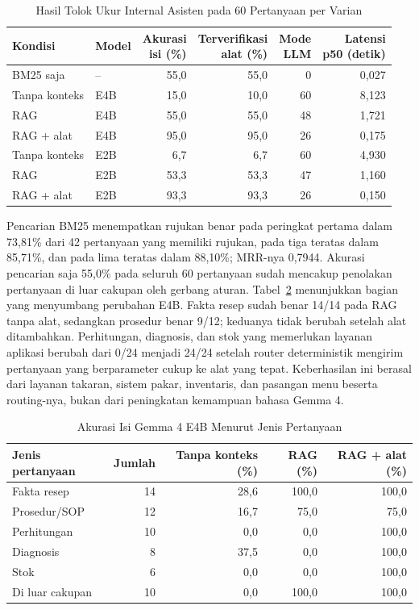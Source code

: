 \begin{table}[htbp]
\centering
\caption{Hasil Tolok Ukur Internal Asisten pada 60 Pertanyaan per Varian}
\label{tab:hasil-asisten}
\small
\begin{tabular}{llrrrr}
\toprule
Kondisi & Model & \shortstack{Akurasi\\isi (\%)} & \shortstack{Terverifikasi\\alat (\%)} & \shortstack{Mode\\LLM} & \shortstack{Latensi\\p50 (detik)} \\
\midrule
BM25 saja & -- & 55,0 & 55,0 & 0 & 0,027 \\
Tanpa konteks & E4B & 15,0 & 10,0 & 60 & 8,123 \\
RAG & E4B & 55,0 & 55,0 & 48 & 1,721 \\
RAG + alat & E4B & 95,0 & 95,0 & 26 & 0,175 \\
Tanpa konteks & E2B & 6,7 & 6,7 & 60 & 4,930 \\
RAG & E2B & 53,3 & 53,3 & 47 & 1,160 \\
RAG + alat & E2B & 93,3 & 93,3 & 26 & 0,150 \\
\bottomrule
\end{tabular}
\end{table}

Pencarian BM25 menempatkan rujukan benar pada peringkat pertama dalam 73,81\% dari 42 pertanyaan yang memiliki rujukan, pada tiga teratas dalam 85,71\%, dan pada lima teratas dalam 88,10\%; MRR-nya 0,7944. Akurasi pencarian saja 55,0\% pada seluruh 60 pertanyaan sudah mencakup penolakan pertanyaan di luar cakupan oleh gerbang aturan. Tabel~\ref{tab:hasil-asisten-kategori} menunjukkan bagian yang menyumbang perubahan E4B. Fakta resep sudah benar 14/14 pada RAG tanpa alat, sedangkan prosedur benar 9/12; keduanya tidak berubah setelah alat ditambahkan. Perhitungan, diagnosis, dan stok yang memerlukan layanan aplikasi berubah dari 0/24 menjadi 24/24 setelah router deterministik mengirim pertanyaan yang berparameter cukup ke alat yang tepat. Keberhasilan ini berasal dari layanan takaran, sistem pakar, inventaris, dan pasangan menu beserta routing-nya, bukan dari peningkatan kemampuan bahasa Gemma 4.

\begin{table}[htbp]
\centering
\caption{Akurasi Isi Gemma 4 E4B Menurut Jenis Pertanyaan}
\label{tab:hasil-asisten-kategori}
\small
\begin{tabular}{lrrrr}
\toprule
Jenis pertanyaan & Jumlah & Tanpa konteks (\%) & RAG (\%) & RAG + alat (\%) \\
\midrule
Fakta resep & 14 & 28,6 & 100,0 & 100,0 \\
Prosedur/SOP & 12 & 16,7 & 75,0 & 75,0 \\
Perhitungan & 10 & 0,0 & 0,0 & 100,0 \\
Diagnosis & 8 & 37,5 & 0,0 & 100,0 \\
Stok & 6 & 0,0 & 0,0 & 100,0 \\
Di luar cakupan & 10 & 0,0 & 100,0 & 100,0 \\
\bottomrule
\end{tabular}
\end{table}

